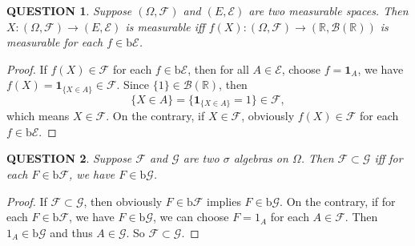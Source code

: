 \documentclass[12pt]{article}
\renewcommand{\b}{\mathscr{B}}
\renewcommand{\i}{\bm{1}}
\renewcommand{\(}{\left(}%
\renewcommand{\)}{\right)}%
\renewcommand{\[}{\left[}%
\renewcommand{\]}{\right]}%
\renewcommand{\r}{\mathbb{R}}
\newcommand{\f}{\mathscr{F}}
\newcommand{\g}{\mathscr{G}}
\newtheorem{question}{QUESTION}[section]}
\newtheorem{proof}{Proof.}}
\begin{document}
  \begin{question}
   Suppose $(\Omega,\f)$ and $(E,\mathscr{E})$ are two measurable spaces. Then $X:(\Omega,\f )\to (E,\mathscr{E})$ is measurable iff $f(X):(\Omega,\f)\to (\r,\b(\r))$ is measurable for each $f\in\mathrm{b}\mathscr{E}$.
  \end{question}
  \begin{proof}
   If $f(X)\in \f$ for each $f\in\mathrm{b}\mathscr{E}$, then for all $A\in \mathscr{E}$, choose $f=\i_{A}$, we have $f(X)=\i_{\{X\in A\}}\in\f$. Since  $\{1\}\in\b(\r)$, then
   \begin{equation*}
    \{X\in A\}=\{\i_{\{X\in A\}}=1\}\in \f,
   \end{equation*}
   which means $X\in\f$. On the contrary, if $X\in\f$, obviously $f(X)\in\f$ for each $f\in\mathrm{b}\mathscr{E}$.
  \end{proof}

  \begin{question}
   Suppose $\f$ and $\g$ are two $\sigma$ algebras on $\Omega$. Then $\f\subset\g$ iff for each $F\in\mathrm{b} \f$, we have $F\in\mathrm{b}\g$.
  \end{question}
  \begin{proof}
   If $\f\subset\g$, then obviously  $F\in\mathrm{b} \f$ implies $F\in\mathrm{b}\g$. On the contrary, if for each $F\in\mathrm{b} \f$, we have $F\in\mathrm{b}\g$, we can choose $F=1_A$ for each $A\in\f$. Then $1_A\in \mathrm{b}\g$ and thus $A\in\g$. So $\f\subset\g$.
  \end{proof}
\end{document}
